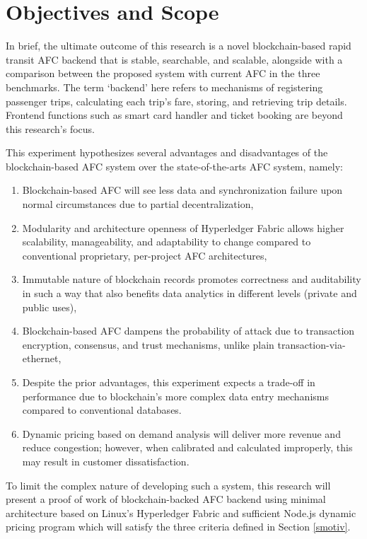 \documentclass[a4paper,12pt,oneside, utf8x]{report}
\begin{document}
\section{Objectives and Scope}
In brief, the ultimate outcome of this research is a novel blockchain-based rapid transit AFC backend that is stable, searchable, and scalable, alongside with a comparison between the proposed system with current AFC in the three benchmarks. The term ‘backend’ here refers to mechanisms of registering passenger trips, calculating each trip’s fare, storing, and retrieving trip details. Frontend functions such as smart card handler and ticket booking are beyond this research’s focus.

This experiment hypothesizes several advantages and disadvantages of the blockchain-based AFC system over the state-of-the-arts AFC system, namely:
\begin{enumerate}
\item Blockchain-based AFC will see less data and synchronization failure upon normal circumstances due to partial decentralization,
\item Modularity and architecture openness of Hyperledger Fabric allows higher scalability, manageability, and adaptability to change compared to conventional proprietary, per-project AFC architectures,
\item Immutable nature of blockchain records promotes correctness and auditability in such a way that also benefits data analytics in different levels (private and public uses),
\item Blockchain-based AFC dampens the probability of attack due to transaction encryption, consensus, and trust mechanisms, unlike plain transaction-via-ethernet,
\item Despite the prior advantages, this experiment expects a trade-off in performance due to blockchain’s more complex data entry mechanisms compared to conventional databases.
\item Dynamic pricing based on demand analysis will deliver more revenue and reduce congestion; however, when calibrated and calculated improperly, this may result in customer dissatisfaction.
\end{enumerate}

To limit the complex nature of developing such a system, this research will present a proof of work of blockchain-backed AFC backend using minimal architecture based on Linux’s Hyperledger Fabric and sufficient Node.js dynamic pricing program which will satisfy the three criteria defined in Section \ref{smotiv}.
\end{document}
